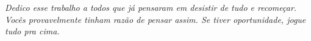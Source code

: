 \begin{dedicatoria}
    \vspace*{\fill}
    \centering
    \noindent
    \textit{Dedico esse trabalho a todos que já pensaram em desistir de tudo e recomeçar. Vocês provavelmente tinham razão de pensar assim. Se tiver oportunidade, jogue tudo pra cima.} \vspace*{\fill}
\end{dedicatoria}
